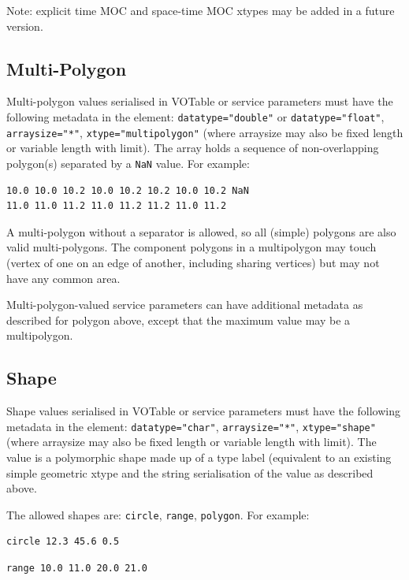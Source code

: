 \documentclass[11pt,letter]{ivoa}
\begin{document}
Note: explicit time MOC and space-time MOC xtypes may be added in a future version.

\subsection{Multi-Polygon}
Multi-polygon values serialised in VOTable or service parameters must have the
following metadata in the  element:  \verb|datatype="double"| or \verb|datatype="float"|,
\verb|arraysize="*"|, \verb|xtype="multipolygon"|
(where arraysize may also be fixed length or variable length with limit).
The array holds a sequence of non-overlapping polygon(s) separated by a \verb|NaN| value. For example:

\begin{verbatim}
10.0 10.0 10.2 10.0 10.2 10.2 10.0 10.2 NaN
11.0 11.0 11.2 11.0 11.2 11.2 11.0 11.2
\end{verbatim}

A multi-polygon without a separator is allowed, so all (simple) polygons are also valid multi-polygons. The
component polygons in a multipolygon may touch (vertex of one on an edge of another, including sharing vertices)
but may not have any common area.

Multi-polygon-valued service parameters can have additional metadata as described
for polygon above, except that the maximum value may be a multipolygon.

\subsection{Shape}
Shape values serialised in VOTable or service parameters must have the following metadata in the
 element: \verb|datatype="char"|, \verb|arraysize="*"|, \verb|xtype="shape"|
(where arraysize may also be fixed length or variable length with limit).
The value is a polymorphic shape made up of a type label (equivalent to an existing simple
geometric xtype and the string serialisation of the value as described above.

The allowed shapes are: \verb|circle|, \verb|range|, \verb|polygon|. For example:

\begin{verbatim}
circle 12.3 45.6 0.5
\end{verbatim}

\begin{verbatim}
range 10.0 11.0 20.0 21.0
\end{verbatim}
\end{document}
